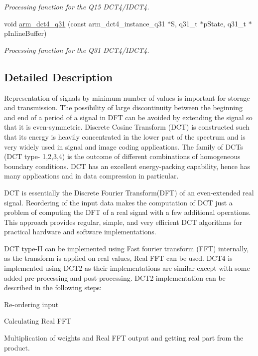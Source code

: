 \begin{DoxyCompactItemize}
\begin{DoxyCompactList}\small\item\em Processing function for the Q15 D\+C\+T4/\+I\+D\+C\+T4. \end{DoxyCompactList}\item 
void \hyperlink{group__DCT4__IDCT4_gad04d0baab6ed081d8e8afe02538eb80b}{arm\+\_\+dct4\+\_\+q31} (const arm\+\_\+dct4\+\_\+instance\+\_\+q31 $\ast$S, q31\+\_\+t $\ast$p\+State, q31\+\_\+t $\ast$p\+Inline\+Buffer)
\begin{DoxyCompactList}\small\item\em Processing function for the Q31 D\+C\+T4/\+I\+D\+C\+T4. \end{DoxyCompactList}\end{DoxyCompactItemize}


\subsection{Detailed Description}
Representation of signals by minimum number of values is important for storage and transmission. The possibility of large discontinuity between the beginning and end of a period of a signal in D\+FT can be avoided by extending the signal so that it is even-\/symmetric. Discrete Cosine Transform (D\+CT) is constructed such that its energy is heavily concentrated in the lower part of the spectrum and is very widely used in signal and image coding applications. The family of D\+C\+Ts (D\+CT type-\/ 1,2,3,4) is the outcome of different combinations of homogeneous boundary conditions. D\+CT has an excellent energy-\/packing capability, hence has many applications and in data compression in particular.

D\+CT is essentially the Discrete Fourier Transform(\+D\+F\+T) of an even-\/extended real signal. Reordering of the input data makes the computation of D\+CT just a problem of computing the D\+FT of a real signal with a few additional operations. This approach provides regular, simple, and very efficient D\+CT algorithms for practical hardware and software implementations.

D\+CT type-\/\+II can be implemented using Fast fourier transform (F\+FT) internally, as the transform is applied on real values, Real F\+FT can be used. D\+C\+T4 is implemented using D\+C\+T2 as their implementations are similar except with some added pre-\/processing and post-\/processing. D\+C\+T2 implementation can be described in the following steps\+:
\begin{DoxyItemize}
\item Re-\/ordering input
\item Calculating Real F\+FT
\item Multiplication of weights and Real F\+FT output and getting real part from the product.
\end{DoxyItemize}

